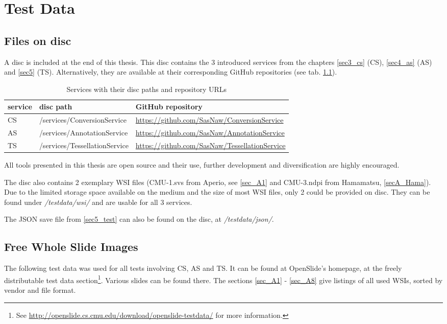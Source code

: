 \chapter{Test Data}

\section{Files on disc}
\label{secA_cd}

A disc is included at the end of this thesis. This disc contains the 3 introduced services from the chapters \ref{sec3_cs} (CS), \ref{sec4_as} (AS) and \ref{sec5} (TS). Alternatively, they are available at their corresponding GitHub repositories (see tab. \ref{tabA_paths}).

\begin{table}[H]
	\begin{center}
		\begin{tabular}{| p{1.5cm} | p{4.5cm} | p{5cm} |}
			\hline
			\textbf{service} & \textbf{disc path} & \textbf{GitHub repository} \\ \hline
			CS & /services/ConversionService & \url{https://github.com/SasNaw/ConversionService} \\ \hline
			AS & /services/AnnotationService & \url{https://github.com/SasNaw/AnnotationService} \\ \hline
			TS & /services/TessellationService & \url{https://github.com/SasNaw/TessellationService}  \\ \hline
		\end{tabular}
		\caption{Services with their disc paths and repository URLs}
		\label{tabA_paths}
	\end{center}
\end{table}

All tools presented in this thesis are open source and their use, further development and diversification are highly encouraged.

The disc also contains 2 exemplary WSI files (CMU-1.svs from Aperio, see \ref{sec_A1} and CMU-3.ndpi from Hamamatsu, \ref{secA_Hama}). Due to the limited storage space available on the medium and the size of most WSI files, only 2 could be provided on disc. They can be found under \emph{/testdata/wsi/} and are usable for all 3 services.

The JSON save file from \ref{sec5_test} can also be found on the disc, at \emph{/testdata/json/}.



\section{Free Whole Slide Images}
\label{secA}
The following test data was used for all tests involving CS, AS and TS. It can be found at OpenSlide's homepage, at the freely distributable test data section\footnote{
	See \url{http://openslide.cs.cmu.edu/download/openslide-testdata/} for more information.
}. Various slides can be found there. The sections \ref{sec_A1} - \ref{sec_A8} give listings of all used WSIs, sorted by vendor and file format.

